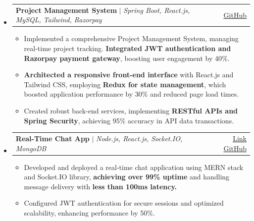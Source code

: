 \documentclass[a4paper,11pt]{article}
\makeatletter
\newcommand{\resumeItem}[1]{
  \item\small{
    {#1 \vspace{-2pt}}
  }
}
\newcommand{\resumeProjectHeading}[2]{
    \item
    \begin{tabular*}{0.97\textwidth}{l@{\extracolsep{\fill}}r}
      \small#1 & #2 \\
    \end{tabular*}\vspace{-7pt}
}
\newcommand{\resumeItemListStart}{\begin{itemize}}
\newcommand{\resumeItemListEnd}{\end{itemize}\vspace{-5pt}}
\makeatother
\begin{document}
\begin{itemize}[leftmargin=0.15in, label={}]
  \resumeProjectHeading
      {\textbf{Project Management System} $|$ \emph{Spring Boot, React.js, MySQL, Tailwind, Razorpay}}{\href{https://github.com/ubednama/Project-Management-System}{\underline{GitHub}}}
      \resumeItemListStart
        \resumeItem{Implemented a comprehensive Project Management System, managing real-time project tracking. \textbf{Integrated JWT authentication and Razorpay payment gateway}, boosting user engagement by 40\%.}
        \resumeItem{\textbf{Architected a responsive front-end interface} with React.js and Tailwind CSS, employing \textbf{Redux for state management}, which boosted application performance by 30\% and reduced page load times.}
        \resumeItem{Created robust back-end services, implementing \textbf{RESTful APIs and Spring Security}, achieving 95\% accuracy in API data transactions.}
      \resumeItemListEnd
\resumeProjectHeading
    {\textbf{Real-Time Chat App} $|$ \emph{Node.js, React.js, Socket.IO, MongoDB}}{\hfill \href{https://chat-app-uwfk.onrender.com/}{\underline{Link}} \textbar{} \href{https://github.com/ubednama/chat-app}{\underline{GitHub}}}
    \resumeItemListStart
        \resumeItem{Developed and deployed a real-time chat application using MERN stack and Socket.IO library, \textbf{achieving over 99\% uptime} and handling message delivery with \textbf{less than 100ms latency.}}
        \resumeItem{Configured JWT authentication for secure sessions and optimized scalability, enhancing performance by 50\%.}
    \resumeItemListEnd
    \end{itemize}

\vfill
{}
\end{document}
